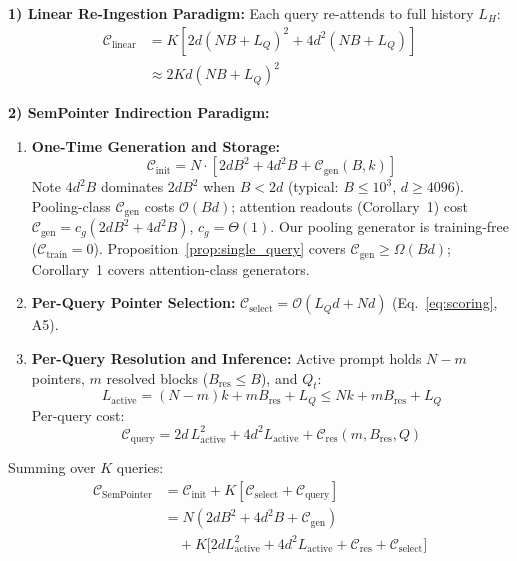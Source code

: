 \documentclass[runningheads]{llncs}
\begin{document}
{\noindent\textbf{1) Linear Re-Ingestion Paradigm:}
Each query re-attends to full history $L_H$:
\begin{align}
    \mathcal{C}_{\text{linear}} &= K \left[ 2 d (NB + L_Q)^2 + 4 d^2 (NB + L_Q) \right] \nonumber \\
&\approx 2 K d (NB + L_Q)^2
\end{align}

\noindent\textbf{2) SemPointer Indirection Paradigm:}
\begin{enumerate}\setlength{\itemsep}{1pt}\setlength{\parsep}{0pt}\setlength{\topsep}{1.5pt}
    \item \textbf{One-Time Generation and Storage:}
    \begin{equation}
    \mathcal{C}_{\text{init}} = N \cdot \left[ 2 d B^2 + 4 d^2 B + \mathcal{C}_{\text{gen}}(B, k) \right]
    \end{equation}
    Note $4d^2B$ dominates $2dB^2$ when $B < 2d$ (typical: $B \le 10^3$, $d \geq 4096$). Pooling-class $\mathcal{C}_{\text{gen}}$ costs $\mathcal{O}(Bd)$; attention readouts (Corollary~1) cost $\mathcal{C}_{\text{gen}} = c_g(2dB^2 + 4d^2 B)$, $c_g = \Theta(1)$. Our pooling generator is training-free ($\mathcal{C}_{\mathrm{train}}=0$). Proposition~\ref{prop:single_query} covers $\mathcal{C}_{\mathrm{gen}} \ge \Omega(Bd)$; Corollary~1 covers attention-class generators.
    \item \textbf{Per-Query Pointer Selection:} $\mathcal{C}_{\mathrm{select}} = \mathcal{O}(L_Q d + Nd)$ (Eq.~\eqref{eq:scoring}, A5).
    \item \textbf{Per-Query Resolution and Inference:} Active prompt holds $N-m$ pointers, $m$ resolved blocks ($B_{\text{res}} \le B$), and $Q_t$:
    \begin{equation}\label{eq:active_seq}
    L_{\mathrm{active}} = (N-m)k + m B_{\mathrm{res}} + L_Q \le Nk + m B_{\mathrm{res}} + L_Q
    \end{equation}
    Per-query cost:
    \begin{equation}
    \mathcal{C}_{\text{query}} = 2 d\, L_{\mathrm{active}}^2 + 4 d^2 L_{\mathrm{active}} + \mathcal{C}_{\text{res}}(m, B_{\text{res}}, Q)
    \end{equation}
\end{enumerate}
Summing over $K$ queries:
\begin{align}
\mathcal{C}_{\text{SemPointer}} &= \mathcal{C}_{\mathrm{init}} + K[\mathcal{C}_{\mathrm{select}} + \mathcal{C}_{\mathrm{query}}] \nonumber \\
&= N(2dB^2 + 4d^2B + \mathcal{C}_{\mathrm{gen}}) \nonumber \\
&\quad + K\big[2dL_{\mathrm{active}}^2 + 4d^2 L_{\mathrm{active}} + \mathcal{C}_{\mathrm{res}} + \mathcal{C}_{\mathrm{select}}\big]
\end{align}

}
\end{document}
